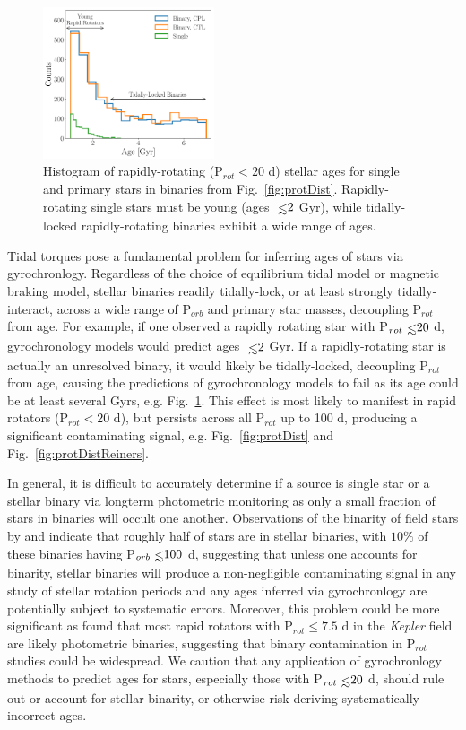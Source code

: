 \documentclass[twocolumn]{aastex61}
\def\lsim{~\rlap{$<$}{\lower 1.0ex\hbox{$\sim$}}}
\newcommand{\kepler}[0]{\textit{Kepler}\xspace}
\begin{document}
\begin{figure}[h]
	\includegraphics[width=0.45\textwidth]{../Plots/protAgeHist.pdf}
   \caption{Histogram of rapidly-rotating (P$_{rot} < 20$ d) stellar ages for single and primary stars in binaries from Fig.~\ref{fig:protDist}. Rapidly-rotating single stars must be young (ages $\lsim 2$ Gyr), while tidally-locked rapidly-rotating binaries exhibit a wide range of ages.}%
    \label{fig:protAgeHist}%
\end{figure}

Tidal torques pose a fundamental problem for inferring ages of stars via gyrochronlogy. Regardless of the choice of equilibrium tidal model or magnetic braking model, stellar binaries readily tidally-lock, or at least strongly tidally-interact, across a wide range of P$_{orb}$ and primary star masses, decoupling P$_{rot}$ from age. For example, if one observed a rapidly rotating star with P$_{rot} \lsim 20$ d, gyrochronology models would predict ages $\lsim 2$ Gyr. If a rapidly-rotating star is actually an unresolved binary, it would likely be tidally-locked, decoupling P$_{rot}$ from age, causing the predictions of gyrochronology models to fail as its age could be at least several Gyrs, e.g. Fig.~\ref{fig:protAgeHist}. This effect is most likely to manifest in rapid rotators (P$_{rot} < 20$ d), but persists across all P$_{rot}$ up to 100 d, producing a significant contaminating signal, e.g. Fig.~\ref{fig:protDist} and Fig.~\ref{fig:protDistReiners}. 

In general, it is difficult to accurately determine if a source is single star or a stellar binary via longterm photometric monitoring as only a small fraction of stars in binaries will occult one another. Observations of the binarity of field stars by \citet{Raghavan2010} and \citet{Duchene2013} indicate that roughly half of stars are in stellar binaries, with $10\%$ of these binaries having P$_{orb} \lsim 100$ d, suggesting that unless one accounts for binarity, stellar binaries will produce a non-negligible contaminating signal in any study of stellar rotation periods and any ages inferred via gyrochronlogy are potentially subject to systematic errors.  Moreover, this problem could be more significant as \citet{Simonian2018} found that most rapid rotators with P$_{rot} \leq 7.5$ d in the \kepler field are likely photometric binaries, suggesting that binary contamination in P$_{rot}$ studies could be widespread. We caution that any application of gyrochronlogy methods to predict ages for stars, especially those with P$_{rot} \lsim 20$ d, should rule out or account for stellar binarity, or otherwise risk deriving systematically incorrect ages.
\end{document}
